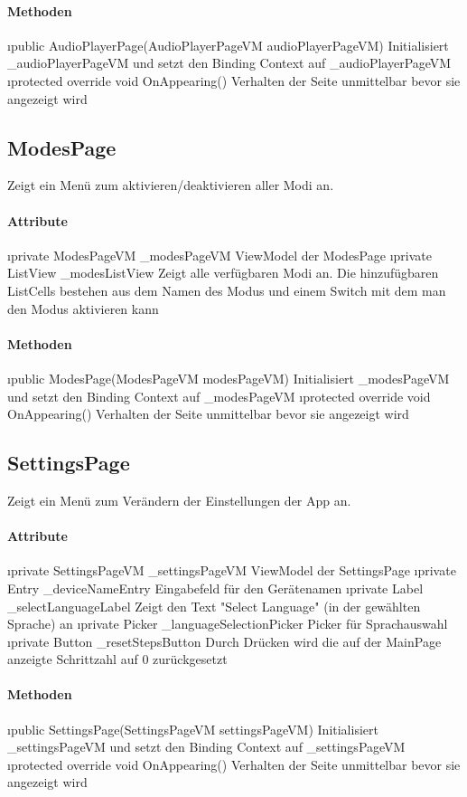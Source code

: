 \documentclass[../entwurf.tex]{subfiles}
\begin{document}
\paragraph{Methoden}

\begin{itemize}
	\i{public AudioPlayerPage(AudioPlayerPageVM audioPlayerPageVM)} Initialisiert \_audioPlayerPageVM und setzt den Binding Context 			auf \_audioPlayerPageVM
	\i{protected override void OnAppearing()} Verhalten der Seite unmittelbar bevor sie angezeigt wird
\end{itemize}

\subsection{ModesPage}
Zeigt ein Menü zum aktivieren/deaktivieren aller Modi an.
\paragraph{Attribute}
\begin{itemize}
	\i{private ModesPageVM \_modesPageVM} ViewModel der ModesPage
	\i{private ListView \_modesListView} Zeigt alle verfügbaren Modi an. Die hinzufügbaren ListCells bestehen aus dem Namen des Modus und einem Switch mit dem man den Modus aktivieren kann
\end{itemize}

\paragraph{Methoden}

\begin{itemize}
	\i{public ModesPage(ModesPageVM modesPageVM)} Initialisiert \_modesPageVM und setzt den Binding Context 			auf \_modesPageVM
	\i{protected override void OnAppearing()} Verhalten der Seite unmittelbar bevor sie angezeigt wird
\end{itemize}

\subsection{SettingsPage}
Zeigt ein Menü zum Verändern der Einstellungen der App an.
\paragraph{Attribute}

\begin{itemize}
	\i{private SettingsPageVM \_settingsPageVM} ViewModel der SettingsPage
	\i{private Entry \_deviceNameEntry} Eingabefeld für den Gerätenamen
	\i{private Label \_selectLanguageLabel} Zeigt den Text "Select Language" (in der gewählten Sprache) an
	\i{private Picker \_languageSelectionPicker} Picker für Sprachauswahl
	\i{private Button \_resetStepsButton} Durch Drücken wird die auf der MainPage anzeigte Schrittzahl auf 0 zurückgesetzt
\end{itemize}

\paragraph{Methoden}

\begin{itemize}
	\i{public SettingsPage(SettingsPageVM settingsPageVM)} Initialisiert \_settingsPageVM und setzt den Binding Context 			auf \_settingsPageVM
	\i{protected override void OnAppearing()} Verhalten der Seite unmittelbar bevor sie angezeigt wird
\end{itemize}
\end{document}
